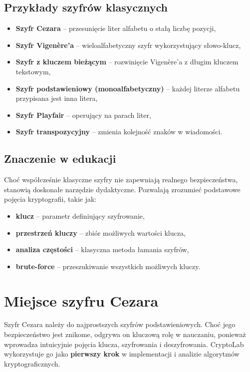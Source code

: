 \documentclass[12pt,a4paper]{article}
\begin{document}
\subsection{Przykłady szyfrów klasycznych}
\begin{itemize}
    \item \textbf{Szyfr Cezara} -- przesunięcie liter alfabetu o stałą liczbę pozycji,
    \item \textbf{Szyfr Vigenère'a} -- wieloalfabetyczny szyfr wykorzystujący słowo-klucz,
    \item \textbf{Szyfr z kluczem bieżącym} -- rozwinięcie Vigenère'a z długim kluczem tekstowym,
    \item \textbf{Szyfr podstawieniowy (monoalfabetyczny)} -- każdej literze alfabetu przypisana jest inna litera,
    \item \textbf{Szyfr Playfair} -- operujący na parach liter,
    \item \textbf{Szyfr transpozycyjny} -- zmienia kolejność znaków w wiadomości.
\end{itemize}

\subsection{Znaczenie w edukacji}
Choć współcześnie klasyczne szyfry nie zapewniają realnego bezpieczeństwa, 
stanowią doskonałe narzędzie dydaktyczne. 
Pozwalają zrozumieć podstawowe pojęcia kryptografii, takie jak:
\begin{itemize}
    \item \textbf{klucz} -- parametr definiujący szyfrowanie,
    \item \textbf{przestrzeń kluczy} -- zbiór możliwych wartości klucza,
    \item \textbf{analiza częstości} -- klasyczna metoda łamania szyfrów,
    \item \textbf{brute-force} -- przeszukiwanie wszystkich możliwych kluczy.
\end{itemize}

\section{Miejsce szyfru Cezara}
Szyfr Cezara należy do najprostszych szyfrów podstawieniowych. 
Choć jego bezpieczeństwo jest znikome, odgrywa on kluczową rolę w nauczaniu, 
ponieważ wprowadza intuicyjnie pojęcia klucza, szyfrowania i deszyfrowania. 
CryptoLab wykorzystuje go jako \textbf{pierwszy krok} w implementacji i analizie algorytmów kryptograficznych.
\end{document}
